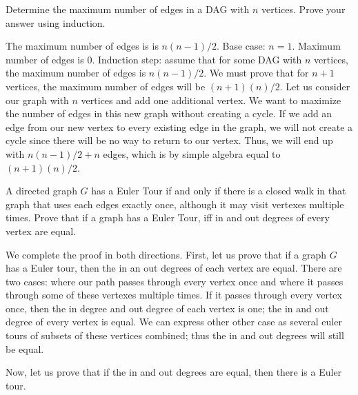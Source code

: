 \documentclass[solution, letterpaper]{cs20}
\begin{document}



\subproblem Determine the maximum number of edges in a DAG with $n$ vertices.
\subproblem Prove your answer using induction.  

\begin{solution}
\subsolution The maximum number of edges is is $n(n-1)/2$. 
\subsolution Base case: $n = 1$. Maximum number of edges is 0. 
Induction step: assume that for some DAG with $n$ vertices, the maximum number of edges is $n(n-1)/2$. We must prove that for $n+1$ vertices, the maximum number of edges will be $(n+1)(n)/2$. Let us consider our graph with $n$ vertices and add one additional vertex.  We want to maximize the number of edges in this new graph without creating a cycle. If we add an edge from our new vertex to every existing edge in the graph, we will not create a cycle since there will be no way to return to our vertex. Thus, we will end up with $n(n-1)/2 + n$ edges, which is by simple algebra equal to $(n+1)(n)/2$. 
\end{solution}


A directed graph $G$ has a Euler Tour if and only if there is a closed walk in that graph that uses each edges exactly once, although it may visit vertexes multiple times. Prove that if a graph has a Euler Tour, iff in and out degrees of every vertex are equal. 

\begin{solution}
We complete the proof in both directions. First, let us prove that if a graph $G$ has a Euler tour, then the in an out degrees of each vertex are equal. There are two cases: where our path passes through every vertex once and where it passes through some of these vertexes multiple times. If it passes through every vertex once, then the in degree and out degree of each vertex is one; the in and out degree of every vertex is equal. We can express other other case as several euler tours of subsets of these vertices combined; thus the in and out degrees will still be equal. 

Now, let us prove that if the in and out degrees are equal, then there is a Euler tour. 

\end{solution}
\end{document}
